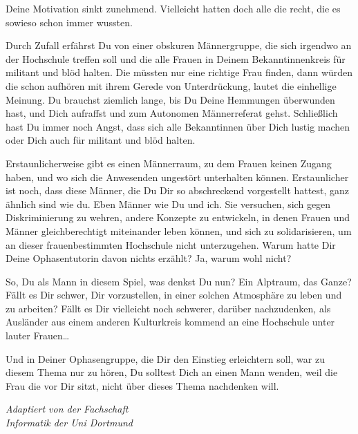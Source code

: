 {Deine Motivation sinkt zunehmend. Vielleicht hatten doch alle die recht, die es sowieso schon immer wussten. 

Durch Zufall erfährst Du von einer obskuren Männergruppe, die sich irgendwo an der Hochschule treffen soll und die alle Frauen in Deinem Bekanntinnenkreis für militant und blöd halten. Die müssten nur eine richtige Frau finden, dann würden die schon aufhören mit ihrem Gerede von Unterdrückung, lautet die einhellige Meinung. Du brauchst ziemlich lange, bis Du Deine Hemmungen überwunden hast, und Dich aufraffst und zum Autonomen Männerreferat gehst. Schließlich hast Du immer noch Angst, dass sich alle Bekanntinnen über Dich lustig machen oder Dich auch für militant und blöd halten. 

Erstaunlicherweise gibt es einen Männer\-raum, zu dem Frauen keinen Zugang haben, und wo sich die Anwesenden ungestört unterhalten können. Erstaunlicher ist noch, dass diese Männer, die Du Dir so abschreckend vorgestellt hattest, ganz ähnlich sind wie du. Eben Männer wie Du und ich. Sie versuchen, sich gegen Diskriminierung zu wehren, andere Konzepte zu entwickeln, in denen Frauen und Männer gleichberechtigt miteinander leben können, und sich zu solidarisieren, um an dieser frauenbestimmten Hochschule nicht unterzugehen. Warum hatte Dir Deine Ophasentutorin davon nichts erzählt? Ja, warum wohl nicht?

So, Du als Mann in diesem Spiel, was denkst Du nun? Ein Alptraum, das Ganze? Fällt es Dir schwer, Dir vorzustellen, in einer solchen Atmosphäre zu leben und zu arbeiten? Fällt es Dir vielleicht noch schwerer, darüber nachzudenken, als Ausländer aus einem anderen Kulturkreis kommend an eine Hochschule unter lauter Frauen…

Und in Deiner Ophasengruppe, die Dir den Einstieg erleichtern soll, war zu diesem Thema nur zu hören, Du solltest Dich an einen Mann wenden, weil die Frau die vor Dir sitzt, nicht über dieses Thema nachdenken will.

}{\textit{Adaptiert von der Fachschaft\\
Informatik der Uni Dortmund}}